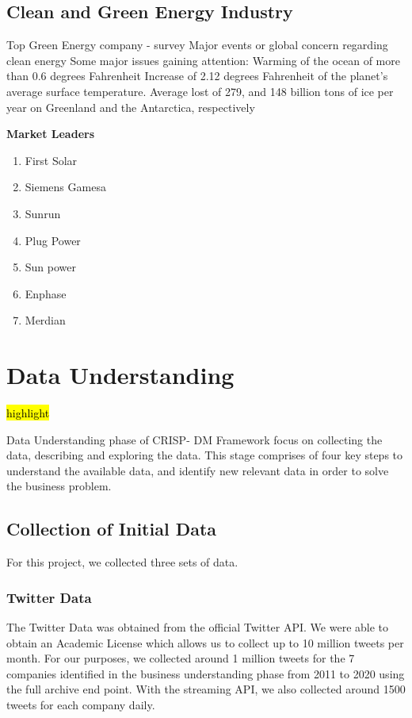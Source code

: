 \documentclass[sigconf, nonacm]{acmart}
\begin{document}
\subsection{Clean and Green Energy Industry }
Top Green Energy company - survey
Major events or global concern regarding clean energy
Some major issues gaining attention:
Warming of the ocean of more than 0.6 degrees Fahrenheit
Increase of 2.12 degrees Fahrenheit of the planet’s average surface temperature.
Average lost of 279, and 148 billion tons of ice per year on Greenland and the Antarctica, respectively

\textbf{Market Leaders }
\begin{enumerate}
    \item First Solar
    \item Siemens Gamesa
    \item Sunrun
    \item Plug Power
    \item Sun power 
    \item Enphase 
    \item Merdian 
\end{enumerate}






\section{Data Understanding}
\hl{highlight}

Data Understanding phase of CRISP- DM Framework focus on collecting the data, describing and exploring the data.
This stage comprises of four key steps to understand the available data, and identify new relevant data in order to solve the business problem. 




\subsection{Collection of Initial Data} %
For this project, we collected three sets of data.

\subsubsection{Twitter Data}
The Twitter Data was obtained from the official Twitter API. We were able to obtain an Academic License which allows us to collect up to 10 million tweets per month. For our purposes, we collected around 1 million tweets for the 7 companies identified in the business understanding phase from 2011 to 2020 using the full archive end point. With the streaming API, we also collected around 1500 tweets for each company daily.
\end{document}
